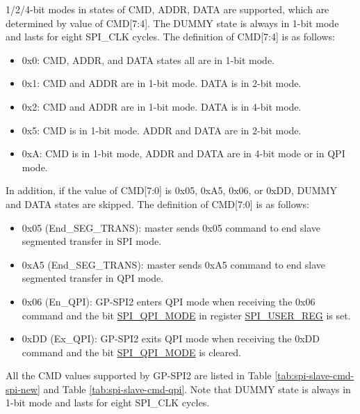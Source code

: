 \documentclass[main\_\_EN.tex]{subfiles}
\begin{document}
1/2/4-bit modes in states of CMD, ADDR, DATA are supported, which are determined by value of CMD[7:4]. The DUMMY state is always in 1-bit mode and lasts for eight SPI\_CLK cycles. The definition of CMD[7:4] is as follows:

\begin{itemize}
    \item 0x0: CMD, ADDR, and DATA states all are in 1-bit mode.
    \item 0x1: CMD and ADDR are in 1-bit mode. DATA is in 2-bit mode.
    \item 0x2: CMD and ADDR are in 1-bit mode. DATA is in 4-bit mode.
    \item 0x5: CMD is in 1-bit mode. ADDR and DATA are in 2-bit mode.
    \item 0xA: CMD is in 1-bit mode, ADDR and DATA are in 4-bit mode or in QPI mode.
\end{itemize}

In addition, if the value of CMD[7:0] is 0x05, 0xA5, 0x06, or 0xDD, DUMMY and DATA states are skipped. The definition of CMD[7:0] is as follows:

\begin{itemize}
    \item \label{cmd:ENDSEGTRANS}0x05 (End\_SEG\_TRANS): master sends 0x05 command to end slave segmented transfer in SPI mode.
    \item 0xA5 (End\_SEG\_TRANS): master sends 0xA5 command to end slave segmented transfer in QPI mode. 
    \item 0x06 (En\_QPI): GP-SPI2 enters QPI mode when receiving the 0x06 command and the bit \hyperref[fielddesc:SPIQPIMODE]{SPI\_QPI\_MODE} in register \hyperref[regdesc:SPIUSERREG]{SPI\_USER\_REG} is set.
    \item 0xDD (Ex\_QPI): GP-SPI2 exits QPI mode when receiving the 0xDD command and the bit \hyperref[fielddesc:SPIQPIMODE]{SPI\_QPI\_MODE} is cleared.
\end{itemize}


All the CMD values supported by GP-SPI2 are listed in Table \ref{tab:spi-slave-cmd-spi-new} and Table \ref{tab:spi-slave-cmd-qpi}. Note that DUMMY state is always in 1-bit mode and lasts for eight SPI\_CLK cycles.
\end{document}
